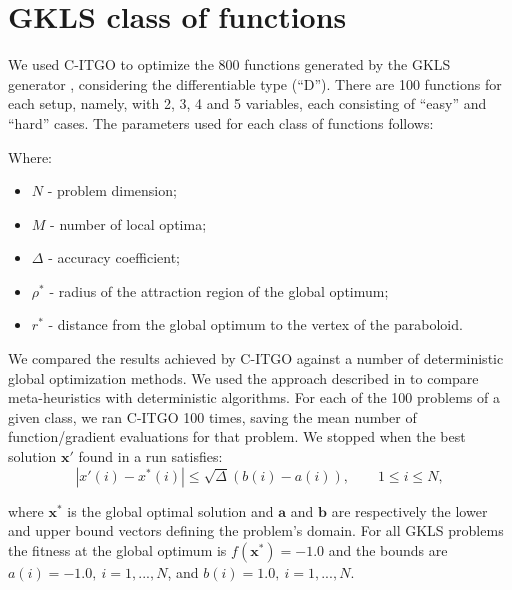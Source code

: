 
\section*{GKLS class of functions}

We used C-ITGO to optimize the 800 functions generated by the GKLS generator \citep{GKLS}, considering the differentiable type (“D”). There are 100 functions for each setup, namely, with 2, 3, 4 and 5 variables, each consisting of “easy” and “hard” cases. The parameters used for each class of functions follows:





\noindent
Where:


\begin{itemize}

\item $N$ - problem dimension;
\item $M$ - number of local optima;
\item $\Delta$ - accuracy coefficient;
\item $\rho^*$ - radius of the attraction region of the global optimum;
\item $r^*$ - distance from the global optimum to the vertex of the paraboloid.

\end{itemize}


We compared the results achieved by C-ITGO against a number of deterministic global optimization methods. We used the approach described in \cite{NAT} to compare meta-heuristics with deterministic algorithms. For each of the 100 problems of a given class, we ran C-ITGO 100 times, saving the mean number of function/gradient evaluations for that problem. We stopped when the best solution $\bm{x}'$ found in a run satisfies:\\[-2.5em]

\begin{equation}\label{eq:Convergence}
    |x'(i) - x^*(i)| \leq \sqrt{\Delta}(b(i) - a(i)), \qquad 1 \leq i \leq N,
\end{equation}


\noindent
where $\bm{x}^*$ is the global optimal solution and $\bm{a}$ and $\bm{b}$ are respectively the lower and upper bound vectors defining the problem's domain. For all GKLS problems the fitness at the global optimum is $f(\bm{x}^*) = -1.0$ and the bounds are $a(i) = -1.0, \ i = 1, ..., N$, and $b(i) = 1.0, \ i = 1, ..., N$.

